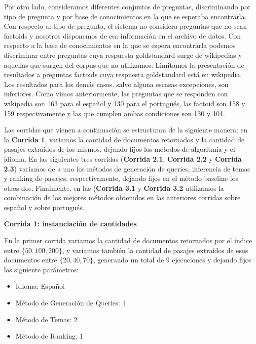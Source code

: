 Por otro lado, consideramos diferentes conjuntos de preguntas, discriminando por tipo de pregunta y por base de conocimientos en la que se esperaba encontrarla. Con respecto al tipo de pregunta, el sistema no considera preguntas que no sean factoids y nosotros disponemos de esa información en el archivo de datos. Con respecto a la base de conocimientos en la que se espera encontrarla podemos discriminar entre preguntas cuya respuesta goldstandard surge de wikipedias y aquellas que surgen del corpus que no utilizamos. Limitamos la presentación de resultados a preguntas factoids cuya respuesta goldstandard está en wikipedia. Los resultados para los demás casos, salvo alguna escasas excepciones, son inferiores. Como vimos anteriormente, las preguntas que se responden con wikipedia son 163 para el español y 130 para el portugués, las factoid son 158 y 159 respectivamente y las que cumplen ambas condiciones son 130 y 104. \newline

Las corridas que vienen a continuación se estructuran de la siguiente manera: en la \textbf{Corrida 1}, variamos la cantidad de documentos retornados y la cantidad de pasajes extraídos de los mismos, dejando fijos los métodos de algoritmia y el idioma. En las siguientes tres corridas (\textbf{Corrida 2.1},  \textbf{Corrida 2.2} y \textbf{Corrida 2.3}) variamos de a uno los métodos de generación de queries, inferencia de temas y ranking de pasajes, respectivamente, dejando fijos en el método baseline los otros dos. Finalmente, en las (\textbf{Corrida 3.1} y \textbf{Corrida 3.2} utilizamos la combinación de los mejores métodos obtenidos en las anteriores corridas sobre español y sobre portugués. \newline

\textbf{Corrida 1: instanciación de cantidades} \newline

En la primer corrida variamos la cantidad de documentos retornados por el índice entre $\{50, 100, 200\}$, y variamos también la cantidad de pasajes extraídos de esos documentos entre $\{20, 40, 70\}$, generando un total de 9 ejecuciones y dejando fijos los siguiente parámetros: \newline

\begin{itemize}
  \item Idioma: Español
  \item Método de Generación de Queries: 1
  \item Método de Temas: 2
  \item Método de Ranking: 1
\end{itemize}

